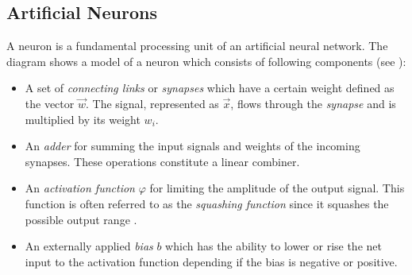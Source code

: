 \subsection{Artificial Neurons}

A neuron is a fundamental processing unit of an artificial neural network. The diagram \label{fig:neuron} shows a model of a neuron which consists of following components (see \cite{Haykin:1998:NNC:521706}):
\begin{itemize}
  \item A set of \textit{connecting links} or \textit{synapses} which have a certain weight defined as the vector $\vec{w}$. The signal, represented as $\vec{x}$, flows through the \textit{synapse} and is multiplied by its weight $w_i$.
  \item An \textit{adder} for summing the input signals and weights of the incoming synapses. These operations constitute a linear combiner.
  \item An \textit{activation function} $\varphi$ for limiting the amplitude of the output signal. This function is often referred to as the \textit{squashing function} since it squashes the possible output range \cite{Haykin:1998:NNC:521706}.
  \item An externally applied \textit{bias} $b$ which has the ability to lower or rise the net input to the activation function depending if the bias is negative or positive.
\end{itemize}
